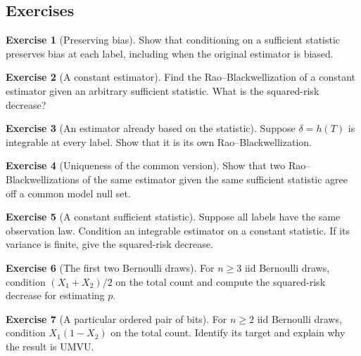 \documentclass[11pt,oneside]{book}
\theoremstyle{definition}
\newtheorem{exercise}{Exercise}[section]
\theoremstyle{remark}
\begin{document}
\subsection{Exercises}
\label{subsec:exercises-5-3}

\begin{exercise}[Preserving bias]
\label{exer:rao-blackwell-preserves-bias}
Show that conditioning on a sufficient statistic preserves bias at
each label, including when the original estimator is biased.
\end{exercise}

\begin{exercise}[A constant estimator]
\label{exer:rao-blackwell-constant}
Find the Rao--Blackwellization of a constant estimator given an
arbitrary sufficient statistic. What is the squared-risk decrease?
\end{exercise}

\begin{exercise}[An estimator already based on the statistic]
\label{exer:rao-blackwell-fixed-function}
Suppose $\delta=h(T)$ is integrable at every label. Show that it is
its own Rao--Blackwellization.
\end{exercise}

\begin{exercise}[Uniqueness of the common version]
\label{exer:rao-blackwell-versions}
Show that two Rao--Blackwellizations of the same estimator given
the same sufficient statistic agree off a common model null set.
\end{exercise}

\begin{exercise}[A constant sufficient statistic]
\label{exer:rao-blackwell-one-law}
Suppose all labels have the same observation law. Condition an
integrable estimator on a constant statistic. If its variance is
finite, give the squared-risk decrease.
\end{exercise}

\begin{exercise}[The first two Bernoulli draws]
\label{exer:rao-blackwell-two-bit-sum}
For $n\geq3$ iid Bernoulli draws, condition $(X_1+X_2)/2$ on
the total count and compute the squared-risk decrease for estimating $p$.
\end{exercise}

\begin{exercise}[A particular ordered pair of bits]
\label{exer:rao-blackwell-ordered-pair}
For $n\geq2$ iid Bernoulli draws, condition $X_1(1-X_2)$ on
the total count. Identify its target and explain why the result is UMVU.
\end{exercise}
\end{document}
